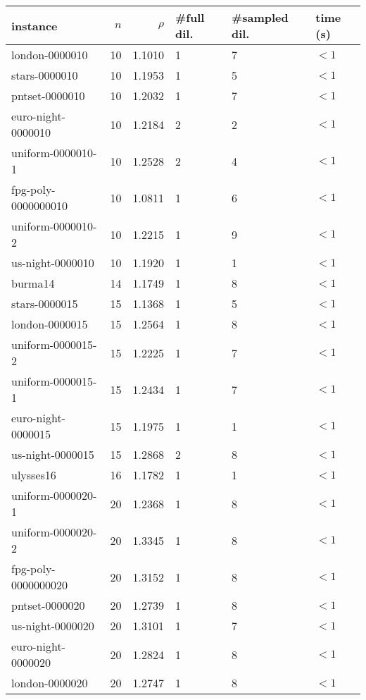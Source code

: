 
\begin{longtable}{|lrrlll|}
    \hline
    instance & $n$ & $\rho$ & \#full dil. & \#sampled dil. & \binmdt{} time (s) \\
    \hline
    \endhead
    london-0000010 & 10 & \num{1.1010} & \num{1} & \num{7} & $<1$ \\
stars-0000010 & 10 & \num{1.1953} & \num{1} & \num{5} & $<1$ \\
pntset-0000010 & 10 & \num{1.2032} & \num{1} & \num{7} & $<1$ \\
euro-night-0000010 & 10 & \num{1.2184} & \num{2} & \num{2} & $<1$ \\
uniform-0000010-1 & 10 & \num{1.2528} & \num{2} & \num{4} & $<1$ \\
fpg-poly-0000000010 & 10 & \num{1.0811} & \num{1} & \num{6} & $<1$ \\
uniform-0000010-2 & 10 & \num{1.2215} & \num{1} & \num{9} & $<1$ \\
us-night-0000010 & 10 & \num{1.1920} & \num{1} & \num{1} & $<1$ \\
burma14 & 14 & \num{1.1749} & \num{1} & \num{8} & $<1$ \\
stars-0000015 & 15 & \num{1.1368} & \num{1} & \num{5} & $<1$ \\
london-0000015 & 15 & \num{1.2564} & \num{1} & \num{8} & $<1$ \\
uniform-0000015-2 & 15 & \num{1.2225} & \num{1} & \num{7} & $<1$ \\
uniform-0000015-1 & 15 & \num{1.2434} & \num{1} & \num{7} & $<1$ \\
euro-night-0000015 & 15 & \num{1.1975} & \num{1} & \num{1} & $<1$ \\
us-night-0000015 & 15 & \num{1.2868} & \num{2} & \num{8} & $<1$ \\
ulysses16 & 16 & \num{1.1782} & \num{1} & \num{1} & $<1$ \\
uniform-0000020-1 & 20 & \num{1.2368} & \num{1} & \num{8} & $<1$ \\
uniform-0000020-2 & 20 & \num{1.3345} & \num{1} & \num{8} & $<1$ \\
fpg-poly-0000000020 & 20 & \num{1.3152} & \num{1} & \num{8} & $<1$ \\
pntset-0000020 & 20 & \num{1.2739} & \num{1} & \num{8} & $<1$ \\
us-night-0000020 & 20 & \num{1.3101} & \num{1} & \num{7} & $<1$ \\
euro-night-0000020 & 20 & \num{1.2824} & \num{1} & \num{8} & $<1$ \\
london-0000020 & 20 & \num{1.2747} & \num{1} & \num{8} & $<1$ \\

\end{longtable}
